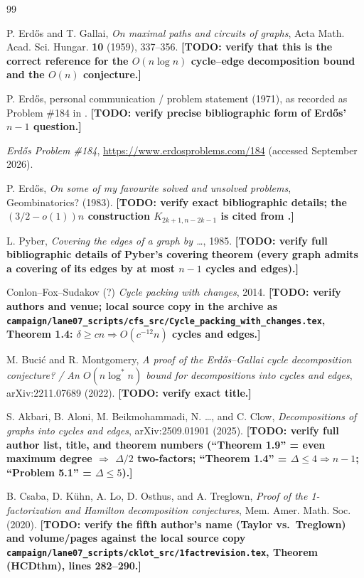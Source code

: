 \documentclass[a4paper,11pt]{amsart}
\theoremstyle{definition}
\theoremstyle{remark}
\newcommand{\TODO}[1]{\textbf{[TODO: #1]}}
\begin{document}
\begin{thebibliography}{99}

 P. Erd\H{o}s and T. Gallai, \emph{On maximal paths and circuits of graphs}, Acta Math. Acad.
Sci. Hungar. \textbf{10} (1959), 337--356. \TODO{verify that this is the correct reference for the
$O(n\log n)$ cycle--edge decomposition bound and the $O(n)$ conjecture.}

 P. Erd\H{o}s, personal communication / problem statement (1971), as recorded as Problem
\#184 in \cite{EP184}. \TODO{verify precise bibliographic form of Erd\H{o}s' $n-1$ question.}

 \emph{Erd\H{o}s Problem \#184}, \url{https://www.erdosproblems.com/184} (accessed
September 2026).

 P. Erd\H{o}s, \emph{On some of my favourite solved and unsolved problems}, Geombinatorics?
(1983). \TODO{verify exact bibliographic details; the $(3/2-o(1))n$ construction $K_{2k+1,n-2k-1}$ is cited
from \cite{BM22}.}

 L. Pyber, \emph{Covering the edges of a graph by \dots}, 1985. \TODO{verify full
bibliographic details of Pyber's covering theorem (every graph admits a covering of its edges by at most
$n-1$ cycles and edges).}

 Conlon--Fox--Sudakov (?) \emph{Cycle packing with changes}, 2014.
\TODO{verify authors and venue; local source copy in the archive as
\texttt{campaign/lane07\_scripts/cfs\_src/Cycle\_packing\_with\_changes.tex}, Theorem 1.4:
$\delta\ge cn\Rightarrow O(c^{-12}n)$ cycles and edges.}

 M. Buci\'c and R. Montgomery, \emph{A proof of the Erd\H{o}s--Gallai cycle decomposition
conjecture? / An $O(n\log^* n)$ bound for decompositions into cycles and edges}, arXiv:2211.07689 (2022).
\TODO{verify exact title.}

 S. Akbari, B. Aloni, M. Beikmohammadi, N. \ldots, and C. Clow, \emph{Decompositions of
graphs into cycles and edges}, arXiv:2509.01901 (2025). \TODO{verify full author list, title, and theorem
numbers (``Theorem 1.9'' = even maximum degree $\Rightarrow$ $\Delta/2$ two-factors; ``Theorem 1.4'' =
$\Delta\le4\Rightarrow n-1$; ``Problem 5.1'' = $\Delta\le5$).}

 B. Csaba, D. K\"uhn, A. Lo, D. Osthus, and A. Treglown, \emph{Proof of the 1-factorization
and Hamilton decomposition conjectures}, Mem. Amer. Math. Soc. (2020). \TODO{verify the fifth author's name
(Taylor vs.\ Treglown) and volume/pages against the local source copy
\texttt{campaign/lane07\_scripts/cklot\_src/1factrevision.tex}, Theorem (HCDthm), lines 282--290.}


\end{thebibliography}
\end{document}
